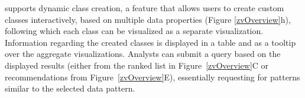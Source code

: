   \item \zvpp supports dynamic class creation, a feature that allows users to create custom classes interactively,
  based on multiple data properties (Figure \ref{zvOverview}h), following which each class can be visualized as a separate visualization. Information regarding the created classes is displayed in a table and as a tooltip over the aggregate visualizations.
\enumend
%
 Analysts can submit a query based on the displayed results (either from the ranked list in Figure~\ref{zvOverview}C or recommendations from Figure~\ref{zvOverview}E), essentially requesting for patterns similar to the selected data pattern.
\problemlist
